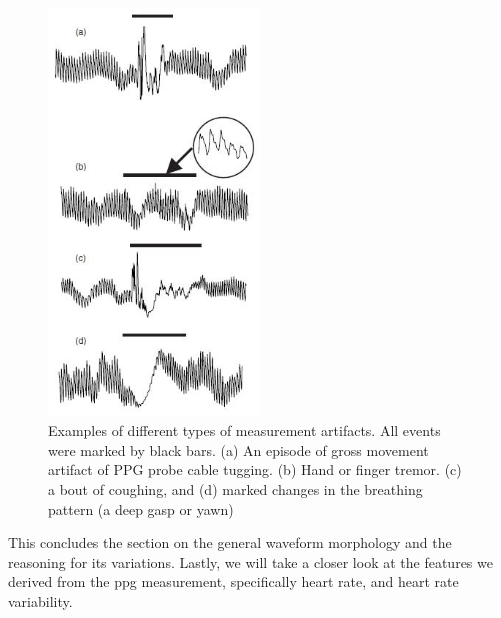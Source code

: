 \begin{figure}[h!]
	\centering
  \includegraphics[width=0.5\textwidth, angle=0]{images/ppg_a.jpg}
	\caption[Types of Measurement Artifacts]{Examples of different types of measurement artifacts. All events were marked by black bars. (a) An episode of gross movement artifact of PPG probe cable tugging. (b) Hand or finger tremor. (c) a bout of coughing, and (d) marked changes in the breathing pattern (a deep gasp or yawn) }
	\label{ppg_a}
\end{figure}

\newpage

This concludes the section on the general waveform morphology and the reasoning for its variations. Lastly, we will take a closer look at the features we derived from the \gls{ppg} measurement, specifically heart rate, and heart rate variability.

